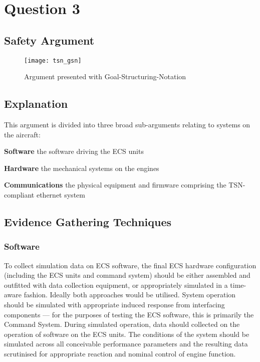 \section{Question 3}

\subsection{Safety Argument}

\begin{figure}[h]
\centering
\texttt{[image: tsn\_gsn]}
\caption{Argument presented with Goal-Structuring-Notation}
\end{figure}

\subsection{Explanation}

This argument is divided into three broad sub-arguments relating to systems on the aircraft: \begin{description}
    \item{\textbf{Software}} the software driving the ECS units
    \item{\textbf{Hardware}} the mechanical systems on the engines
    \item{\textbf{Communications}} the physical equipment and firmware comprising the TSN-compliant ethernet system
\end{description}

\subsection{Evidence Gathering Techniques}

\subsubsection*{Software}


To collect simulation data on ECS software, the final ECS hardware configuration (including the ECS units and command system) should be either assembled and outfitted with data collection equipment, or appropriately simulated in a time-aware fashion.
Ideally both approaches would be utilised.
System operation should be simulated with appropriate induced response from interfacing components --- for the purposes of testing the ECS software, this is primarily the Command System.
During simulated operation, data should collected on the operation of software on the ECS units.
The conditions of the system should be simulated across all conceivable performance parameters and the resulting data scrutinised for appropriate reaction and nominal control of engine function.

